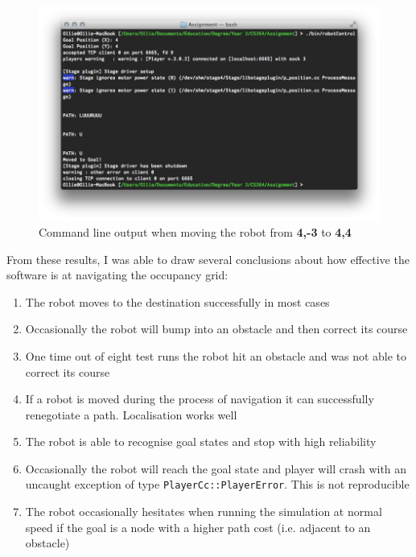 \documentclass[a4paper,12pt]{article}
\begin{document}
\newpage
    \begin{figure}
        \begin{center}
            \includegraphics[scale=0.6]{images/Testing_CLI.png}
            \caption{Command line output when moving the robot from \textbf{4,-3} to \textbf{4,4}}
        \end{center}
\end{figure}

From these results, I was able to draw several conclusions about how effective the software is at navigating the occupancy grid:

\begin{enumerate}
    \item{The robot moves to the destination successfully in most cases}
    \item{Occasionally the robot will bump into an obstacle and then correct its course}
    \item{One time out of eight test runs the robot hit an obstacle and was not able to correct its course}
    \item{If a robot is moved during the process of navigation it can successfully renegotiate a path. Localisation works well}
    \item{The robot is able to recognise goal states and stop with high reliability}
    \item{Occasionally the robot will reach the goal state and player will crash with an uncaught exception of type \texttt{PlayerCc::PlayerError}. This is not reproducible}
    \item{The robot occasionally hesitates when running the simulation at normal speed if the goal is a node with a higher path cost (i.e. adjacent to an obstacle)}
\end{enumerate}
\end{document}
